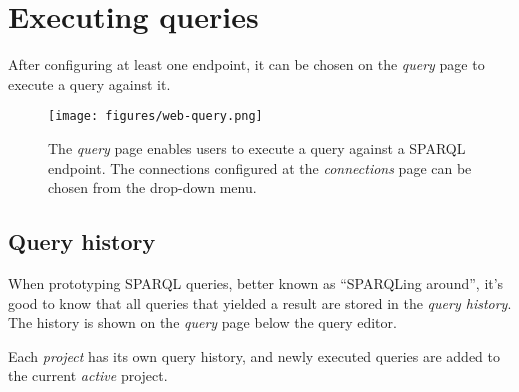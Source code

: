 \section{Executing queries}

  After configuring at least one endpoint, it can be chosen on the \emph{query}
  page to execute a query against it.

  \begin{figure}[h]
    \begin{center}
      \texttt{[image: figures/web-query.png]}
    \end{center}
    \caption{The \emph{query} page enables users to execute a query against a
      SPARQL endpoint.  The connections configured at the \emph{connections} page
      can be chosen from the drop-down menu.}
    \label{fig:web-query}
  \end{figure}

\subsection{Query history}
\label{sec:query-history}

  When prototyping SPARQL queries, better known as ``SPARQLing around'', it's
  good to know that all queries that yielded a result are stored in the
  \emph{query history}.  The history is shown on the \emph{query} page below the
  query editor.

  Each \emph{project} has its own query history, and newly executed queries are
  added to the current \emph{active} project.
